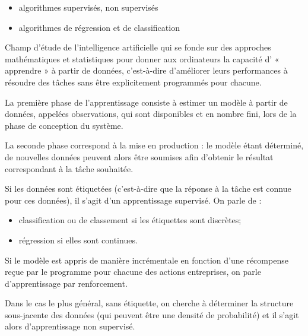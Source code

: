 \begin{itemize}
\item algorithmes supervisés, non supervisés
\item algorithmes de régression et de classification
\end{itemize}

\begin{defi} 
Champ d'étude de l'intelligence artificielle qui se fonde sur des approches mathématiques et statistiques pour donner aux ordinateurs la capacité d' « apprendre » à partir de données, c'est-à-dire d'améliorer leurs performances à résoudre des tâches sans être explicitement programmés pour chacune. 

La première phase de l'apprentissage consiste à estimer un modèle à partir de données, appelées observations, qui sont disponibles et en nombre fini, lors de la phase de conception du système.

 La seconde phase correspond à la mise en production : le modèle étant déterminé, de nouvelles données peuvent alors être soumises afin d'obtenir le résultat correspondant à la tâche souhaitée.
\end{defi}


\begin{defi} 
Si les données sont étiquetées (c'est-à-dire que la réponse à la tâche est connue pour ces données), il s'agit d'un apprentissage supervisé. On parle de :
\begin{itemize}
\item classification ou de classement si les étiquettes sont discrètes;
\item régression si elles sont continues.
\end{itemize}

Si le modèle est appris de manière incrémentale en fonction d'une récompense reçue par le programme pour chacune des actions entreprises, on parle d'apprentissage par renforcement. 

Dans le cas le plus général, sans étiquette, on cherche à déterminer la structure sous-jacente des données (qui peuvent être une densité de probabilité) et il s'agit alors d'apprentissage non supervisé.



\end{defi}



